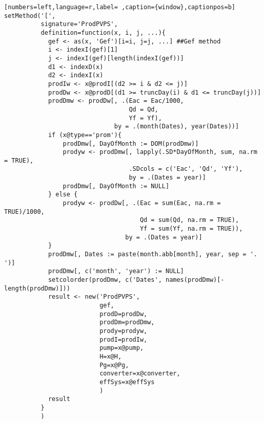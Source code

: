 \begin{lstlisting}[numbers=left,language=r,label= ,caption={window},captionpos=b]
setMethod('[',
          signature='ProdPVPS',
          definition=function(x, i, j, ...){
            gef <- as(x, 'Gef')[i=i, j=j, ...] ##Gef method
            i <- indexI(gef)[1]
            j <- indexI(gef)[length(indexI(gef))]
            d1 <- indexD(x)
            d2 <- indexI(x)
            prodIw <- x@prodI[(d2 >= i & d2 <= j)]
            prodDw <- x@prodD[(d1 >= truncDay(i) & d1 <= truncDay(j))]
            prodDmw <- prodDw[, .(Eac = Eac/1000,
                                  Qd = Qd,
                                  Yf = Yf),
                              by = .(month(Dates), year(Dates))]
            if (x@type=='prom'){
                prodDmw[, DayOfMonth := DOM(prodDmw)]
                prodyw <- prodDmw[, lapply(.SD*DayOfMonth, sum, na.rm = TRUE),
                                  .SDcols = c('Eac', 'Qd', 'Yf'),
                                  by = .(Dates = year)]
                prodDmw[, DayOfMonth := NULL]
            } else {
                prodyw <- prodDw[, .(Eac = sum(Eac, na.rm = TRUE)/1000,
                                     Qd = sum(Qd, na.rm = TRUE),
                                     Yf = sum(Yf, na.rm = TRUE)),
                                 by = .(Dates = year)]
            }
            prodDmw[, Dates := paste(month.abb[month], year, sep = '. ')]
            prodDmw[, c('month', 'year') := NULL]
            setcolorder(prodDmw, c('Dates', names(prodDmw)[-length(prodDmw)]))
            result <- new('ProdPVPS',
                          gef,
                          prodD=prodDw,
                          prodDm=prodDmw,
                          prody=prodyw,
                          prodI=prodIw,
                          pump=x@pump,
                          H=x@H,
                          Pg=x@Pg,
                          converter=x@converter,
                          effSys=x@effSys
                          )
            result
          }
          )
\end{lstlisting}
